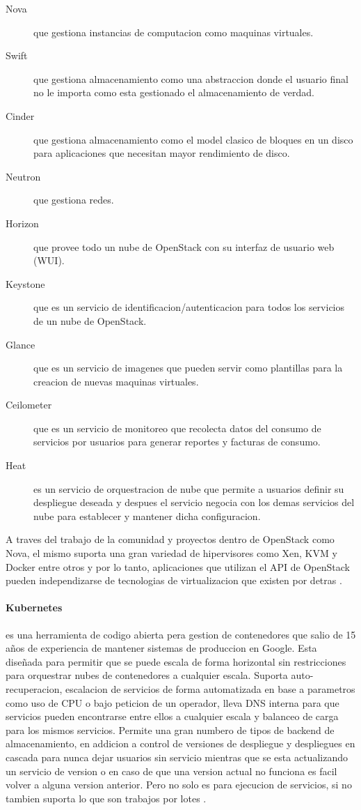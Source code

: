 \begin{description}
	\item[Nova] que gestiona instancias de computacion como maquinas virtuales.
    \item[Swift] que gestiona almacenamiento como una abstraccion donde el usuario final no le importa como esta gestionado el almacenamiento de verdad.
    \item[Cinder] que gestiona almacenamiento como el model clasico de bloques en un disco para aplicaciones que necesitan mayor rendimiento de disco.
    \item[Neutron] que gestiona redes.
    \item[Horizon] que provee todo un nube de OpenStack con su interfaz de usuario web (WUI).
    \item[Keystone] que es un servicio de identificacion/autenticacion para todos los servicios de un nube de OpenStack.
    \item[Glance] que es un servicio de imagenes que pueden servir como plantillas para la creacion de nuevas maquinas virtuales.
    \item[Ceilometer] que es un servicio de monitoreo que recolecta datos del consumo de servicios por usuarios para generar reportes y facturas de consumo.
    \item[Heat] es un servicio de orquestracion de nube que permite a usuarios definir su despliegue deseada y despues el servicio negocia con los demas servicios del nube para establecer y mantener dicha configuracion.
\end{description} \citep{OpenSource-OpenStack}

A traves del trabajo de la comunidad y proyectos dentro de OpenStack como Nova, el mismo suporta una gran variedad de hipervisores como Xen, KVM y Docker entre otros y por lo tanto, aplicaciones que utilizan el API de OpenStack pueden independizarse de tecnologias de virtualizacion que existen por detras \citep{OpenStack-Nova-Support-Matrix} \citep{OpenStack-Nova-Docker}.

\paragraph{Kubernetes}
es una herramienta de codigo abierta pera gestion de contenedores que salio de 15 años de experiencia de mantener sistemas de produccion en Google. Esta diseñada para permitir que se puede escala de forma horizontal sin restricciones para orquestrar nubes de contenedores a cualquier escala. Suporta auto-recuperacion, escalacion de servicios de forma automatizada en base a parametros como uso de CPU o bajo peticion de un operador, lleva DNS interna para que servicios pueden encontrarse entre ellos a cualquier escala y balanceo de carga para los mismos servicios. Permite una gran numbero de tipos de backend de almacenamiento, en addicion a control de versiones de despliegue y despliegues en cascada para nunca dejar usuarios sin servicio mientras que se esta actualizando un servicio de version o en caso de que una version actual no funciona es facil volver a alguna version anterior. Pero no solo es para ejecucion de servicios, si no tambien suporta lo que son trabajos por lotes \citep{kubernetes}.

